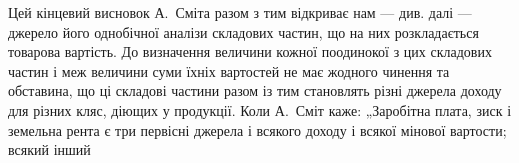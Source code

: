 Цей кінцевий висновок А.~Сміта разом з тим відкриває нам — див.
далі — джерело його однобічної аналізи складових частин, що на них
розкладається товарова вартість. До визначення величини кожної поодинокої
з цих складових частин і меж величини суми їхніх вартостей не має
жодного чинення та обставина, що ці складові частини разом із тим
становлять різні джерела доходу для різних кляс, діющих у продукції.
Коли А.~Сміт каже: „Заробітна плата, зиск і земельна рента є три первісні
джерела і всякого доходу і всякої мінової вартости; всякий інший
\parbreak{}  %
